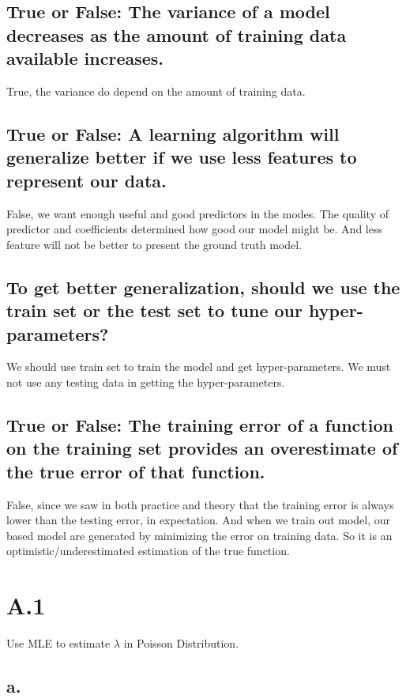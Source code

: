 \documentclass{article}
\begin{document}
\subsection{True or False: The variance of a model decreases as the amount of training data available increases.}

True, the variance do depend on the amount of training data. 

\subsection{True or False: A learning algorithm will generalize better if we use less features to represent our data.}

False, we want enough useful and good predictors in the modes. The quality of predictor and coefficients determined how good our model might be. And less feature will not be better to present the ground truth model.

\subsection{To get better generalization, should we use the train set or the test set to tune our hyper-parameters?}

We should use train set to train the model and get hyper-parameters. We must not use any testing data in getting the hyper-parameters.
\subsection{True or False: The training error of a function on the training set provides an overestimate of the true error of that function.}

False, since we saw in both practice and theory that the training error is always lower than the testing error, in expectation. And when we train out model, our based model are generated by minimizing the error on training data. So it is an optimistic/underestimated estimation of the true function. 

\section*{A.1}
Use MLE to estimate $\lambda$ in Poisson Distribution.
\subsection*{a.}
\end{document}
